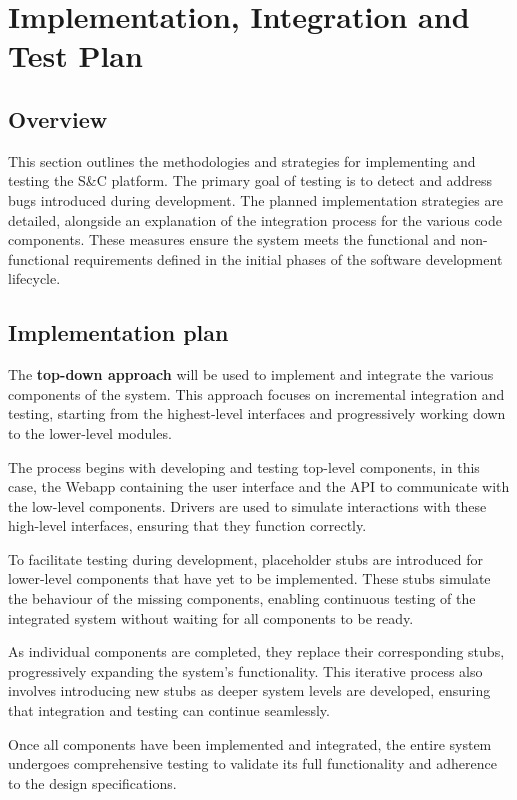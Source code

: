 \newpage

\chapter{Implementation, Integration and Test Plan}
\label{Implementation, Integration and Test Plan}

\section{Overview}
This section outlines the methodologies and strategies for implementing and testing the S\&C platform. The primary goal of testing is to detect and address bugs introduced during development. The planned implementation strategies are detailed, alongside an explanation of the integration process for the various code components. These measures ensure the system meets the functional and non-functional requirements defined in the initial phases of the software development lifecycle.

\section{Implementation plan}
The \textbf{top-down approach} will be used to implement and integrate the various components of the system. This approach focuses on incremental integration and testing, starting from the highest-level interfaces and progressively working down to the lower-level modules.

The process begins with developing and testing top-level components, in this case, the Webapp containing the user interface and the API to communicate with the low-level components. Drivers are used to simulate interactions with these high-level interfaces, ensuring that they function correctly.

To facilitate testing during development, placeholder stubs are introduced for lower-level components that have yet to be implemented. These stubs simulate the behaviour of the missing components, enabling continuous testing of the integrated system without waiting for all components to be ready.

As individual components are completed, they replace their corresponding stubs, progressively expanding the system's functionality. This iterative process also involves introducing new stubs as deeper system levels are developed, ensuring that integration and testing can continue seamlessly.

Once all components have been implemented and integrated, the entire system undergoes comprehensive testing to validate its full functionality and adherence to the design specifications.

